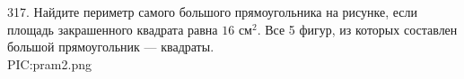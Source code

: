 317. Найдите периметр самого большого прямоугольника на рисунке, если площадь закрашенного квадрата равна $16\text{ см}^2.$ Все 5 фигур, из которых составлен большой прямоугольник --- квадраты.\\
{{PIC:pram2.png}}\\
